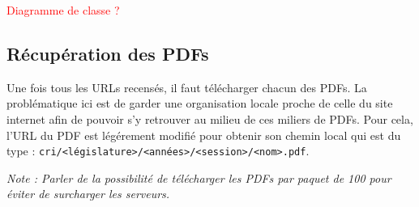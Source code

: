 \textcolor{red}{Diagramme de classe ?}

\subsection{Récupération des PDFs}

Une fois tous les URLs recensés, il faut télécharger chacun des PDFs. La problématique ici est de garder une organisation locale proche de celle du site internet afin de pouvoir s'y retrouver au milieu de ces miliers de PDFs. Pour cela, l'URL du PDF est légérement modifié pour obtenir son chemin local qui est du type : \verb|cri/<législature>/<années>/<session>/<nom>.pdf|.

\textit{Note : Parler de la possibilité de télécharger les PDFs par paquet de 100 pour éviter de surcharger les serveurs.}
